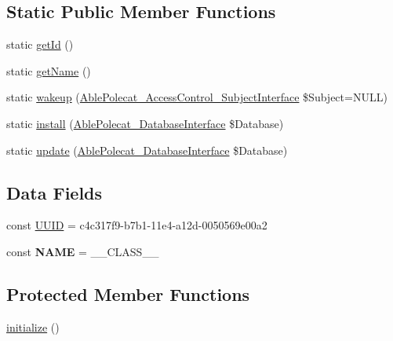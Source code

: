 \subsection*{Static Public Member Functions}
\begin{DoxyCompactItemize}
\item 
static \hyperlink{class_able_polecat___registry___component_acfaa3a96d0cb5a4c0d4d710dcba41e9e}{get\+Id} ()
\item 
static \hyperlink{class_able_polecat___registry___component_a4ef9bd37ba3ce8a13c1e8bcf4f72a630}{get\+Name} ()
\item 
static \hyperlink{class_able_polecat___registry___component_a3f2135f6ad45f51d075657f6d20db2cd}{wakeup} (\hyperlink{interface_able_polecat___access_control___subject_interface}{Able\+Polecat\+\_\+\+Access\+Control\+\_\+\+Subject\+Interface} \$Subject=N\+U\+L\+L)
\item 
static \hyperlink{class_able_polecat___registry___component_a97e9bacf538c072e0542eeb96d2475af}{install} (\hyperlink{interface_able_polecat___database_interface}{Able\+Polecat\+\_\+\+Database\+Interface} \$Database)
\item 
static \hyperlink{class_able_polecat___registry___component_a8398510e79e9787266fe116d6431948c}{update} (\hyperlink{interface_able_polecat___database_interface}{Able\+Polecat\+\_\+\+Database\+Interface} \$Database)
\end{DoxyCompactItemize}
\subsection*{Data Fields}
\begin{DoxyCompactItemize}
\item 
const \hyperlink{class_able_polecat___registry___component_a74b892c8c0b86bf9d04c5819898c51e7}{U\+U\+I\+D} = \textquotesingle{}c4c317f9-\/b7b1-\/11e4-\/a12d-\/0050569e00a2\textquotesingle{}
\item 
\hypertarget{class_able_polecat___registry___component_a244352f035b82b20b0efa506167fd862}{}const {\bfseries N\+A\+M\+E} = \+\_\+\+\_\+\+C\+L\+A\+S\+S\+\_\+\+\_\+\label{class_able_polecat___registry___component_a244352f035b82b20b0efa506167fd862}

\end{DoxyCompactItemize}
\subsection*{Protected Member Functions}
\begin{DoxyCompactItemize}
\item 
\hyperlink{class_able_polecat___registry___component_a91098fa7d1917ce4833f284bbef12627}{initialize} ()
\end{DoxyCompactItemize}
